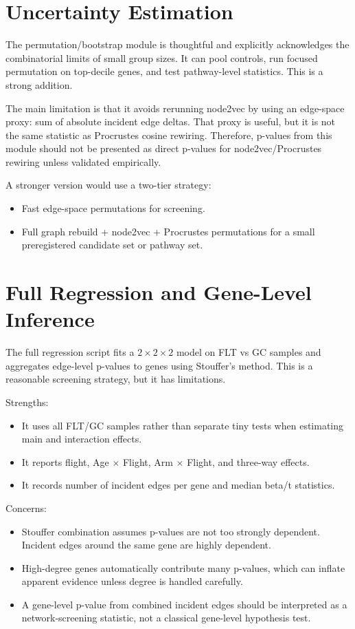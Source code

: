 \documentclass[11pt]{article}
\begin{document}
\section{Uncertainty Estimation}

The permutation/bootstrap module is thoughtful and explicitly acknowledges the combinatorial limits of small group sizes.  It can pool controls, run focused permutation on top-decile genes, and test pathway-level statistics.  This is a strong addition.

The main limitation is that it avoids rerunning node2vec by using an edge-space proxy: sum of absolute incident edge deltas.  That proxy is useful, but it is not the same statistic as Procrustes cosine rewiring.  Therefore, p-values from this module should not be presented as direct p-values for node2vec/Procrustes rewiring unless validated empirically.

A stronger version would use a two-tier strategy:
\begin{itemize}[leftmargin=1.5em]
    \item Fast edge-space permutations for screening.
    \item Full graph rebuild + node2vec + Procrustes permutations for a small preregistered candidate set or pathway set.
\end{itemize}

\section{Full Regression and Gene-Level Inference}

The full regression script fits a $2 \times 2 \times 2$ model on FLT vs GC samples and aggregates edge-level p-values to genes using Stouffer's method.  This is a reasonable screening strategy, but it has limitations.

Strengths:
\begin{itemize}[leftmargin=1.5em]
    \item It uses all FLT/GC samples rather than separate tiny tests when estimating main and interaction effects.
    \item It reports flight, Age $\times$ Flight, Arm $\times$ Flight, and three-way effects.
    \item It records number of incident edges per gene and median beta/t statistics.
\end{itemize}

Concerns:
\begin{itemize}[leftmargin=1.5em]
    \item Stouffer combination assumes p-values are not too strongly dependent.  Incident edges around the same gene are highly dependent.
    \item High-degree genes automatically contribute many p-values, which can inflate apparent evidence unless degree is handled carefully.
    \item A gene-level p-value from combined incident edges should be interpreted as a network-screening statistic, not a classical gene-level hypothesis test.
\end{itemize}
\end{document}

